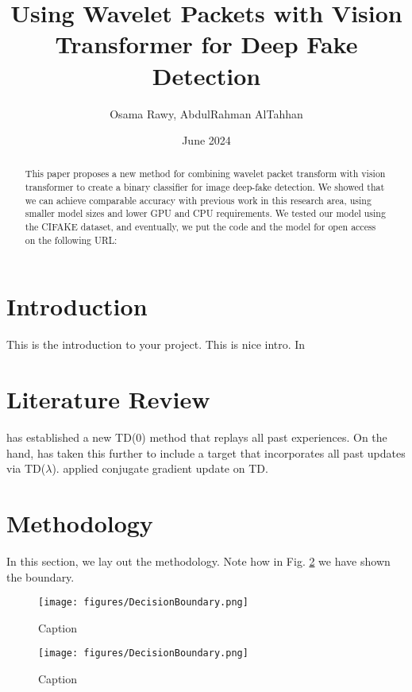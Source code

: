 \documentclass{svproc}
\title{Using Wavelet Packets with Vision Transformer for Deep Fake Detection}
\author{Osama Rawy, AbdulRahman AlTahhan}
\institute{University of Leeds, School of Computing, ODL MSc in AI, UK.}
\date{June 2024}
\begin{document}
\maketitle

\begin{abstract}
    This paper proposes a new method for combining wavelet packet transform with vision transformer to create a binary classifier for image deep-fake detection. We showed that we can achieve comparable accuracy with previous work in this research area, using smaller model sizes and lower GPU and CPU requirements. We tested our model using the CIFAKE dataset, and eventually, we put the code and the model for open access on the following URL:  
    
\end{abstract}

\section{Introduction}
    This is the introduction to your project. This is nice intro. In \cite{NuclearPlant}
    
\section{Literature Review}
    \cite{TD0-Replay} has established a new TD(0) method that replays all past experiences. On the hand, \cite{TD-Replay} has taken this further to include a target that incorporates all past updates via TD($\lambda$). \cite{ConjugateTD} applied conjugate gradient update on TD.


\section{Methodology}
    In this section, we lay out the methodology. Note how in Fig. \ref{fig:my_label} we have shown the boundary.


    \begin{figure}
        \centering
        \texttt{[image: figures/DecisionBoundary.png]}
        \caption{Caption}
        \label{fig:fig2}
    \end{figure}

    
    \begin{figure}
        \centering
        \texttt{[image: figures/DecisionBoundary.png]}
        \caption{Caption}
        \label{fig:my_label}
    \end{figure}
\end{document}
